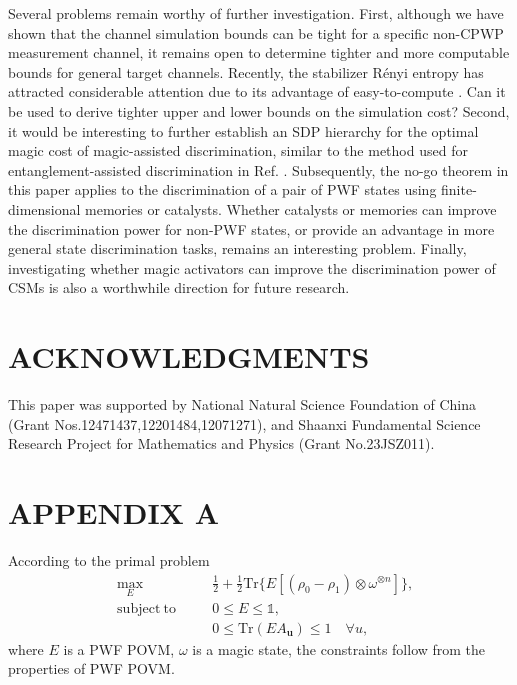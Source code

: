 \documentclass[aps,pra,twocolumn,floatfix,amsfonts,10pt]{revtex4-2}
\begin{document}
Several problems remain worthy of further investigation. 
First, although we have shown that the channel simulation bounds can be tight for a specific non-CPWP measurement channel, it remains open to determine tighter and more computable bounds for general target channels.
Recently, the stabilizer R\'enyi entropy has attracted considerable attention due to its advantage of easy-to-compute \cite{LOH2022,WL2023}. 
Can it be used to derive tighter upper and lower bounds on the simulation cost?
Second, it would be interesting to further establish an SDP hierarchy for the optimal magic cost of magic-assisted discrimination, similar to the method used for entanglement-assisted discrimination in Ref. \cite{ZZL+2025}. 
Subsequently, the no-go theorem in this paper applies to the discrimination of a pair of PWF states using finite-dimensional memories or catalysts. 
Whether catalysts or memories can improve the discrimination power for non-PWF states, or provide an advantage in more general state discrimination tasks, remains an interesting problem. 
Finally, investigating whether magic activators \cite{C2011} can improve the discrimination power of CSMs is also a worthwhile direction for future research.

\section*{ACKNOWLEDGMENTS}
This paper was supported by National Natural Science Foundation of China (Grant Nos.12471437,12201484,12071271), and Shaanxi Fundamental Science Research Project for Mathematics and Physics (Grant No.23JSZ011).

\appendix
\section*{APPENDIX A}
According to the primal problem
\begin{equation}
	\begin{aligned}
		&\max_{E} \quad &&\frac{1}{2}+\frac{1}{2}\mathrm{Tr}\{E[(\rho_0 - \rho_1)\otimes \omega^{\otimes n}]\}, \\ &\mathrm{subject~to} \quad && 0\leqslant E\leqslant\mathds{1},  \\ &&& 0\leqslant \mathrm{Tr}(EA_{\mathbf{u}})\leqslant 1 \quad \forall u,
	\end{aligned}
\end{equation}
where $E$ is a PWF POVM, $\omega$ is a magic state, the constraints follow from the properties of PWF POVM.
\end{document}
